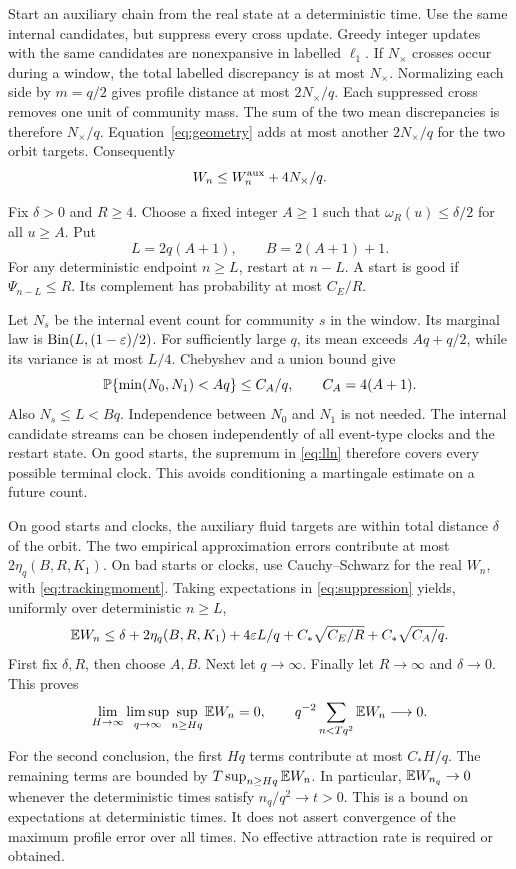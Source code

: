 Start an auxiliary chain from the real state at a deterministic time. Use the same internal candidates, but suppress every cross update. Greedy integer updates with the same candidates are nonexpansive in labelled $\ell_1$. If $N_\times$ crosses occur during a window, the total labelled discrepancy is at most $N_\times$. Normalizing each side by $m=q/2$ gives profile distance at most $2N_\times/q$. Each suppressed cross removes one unit of community mass. The sum of the two mean discrepancies is therefore $N_\times/q$. Equation~\eqref{eq:geometry} adds at most another $2N_\times/q$ for the two orbit targets. Consequently
\begin{equation}\label{eq:suppression}
 W_n\le W_n^{\rm aux}+4N_\times/q.
\end{equation}

Fix $\delta>0$ and $R\ge4$. Choose a fixed integer $A\ge1$ such that $\omega_R(u)\le\delta/2$ for all $u\ge A$. Put
\[
 L=2q(A+1),\qquad B=2(A+1)+1.
\]
For any deterministic endpoint $n\ge L$, restart at $n-L$. A start is good if $\Psi_{n-L}\le R$. Its complement has probability at most $C_E/R$.

Let $N_s$ be the internal event count for community $s$ in the window. Its marginal law is $\operatorname{Bin}(L,(1-\varepsilon)/2)$. For sufficiently large $q$, its mean exceeds $Aq+q/2$, while its variance is at most $L/4$. Chebyshev and a union bound give
\[
 \mathbb P\{\min(N_0,N_1)<Aq\}\le C_A/q,
 \qquad C_A=4(A+1).
\]
Also $N_s\le L<Bq$. Independence between $N_0$ and $N_1$ is not needed. The internal candidate streams can be chosen independently of all event-type clocks and the restart state. On good starts, the supremum in \eqref{eq:lln} therefore covers every possible terminal clock. This avoids conditioning a martingale estimate on a future count.

On good starts and clocks, the auxiliary fluid targets are within total distance $\delta$ of the orbit. The two empirical approximation errors contribute at most $2\eta_q(B,R,K_1)$. On bad starts or clocks, use Cauchy--Schwarz for the real $W_n$, with \eqref{eq:trackingmoment}. Taking expectations in \eqref{eq:suppression} yields, uniformly over deterministic $n\ge L$,
\begin{equation}\label{eq:restart}
 \mathbb E W_n\le\delta+2\eta_q(B,R,K_1)+4\varepsilon L/q
       +C_*\sqrt{C_E/R}+C_*\sqrt{C_A/q}.
\end{equation}
First fix $\delta,R$, then choose $A,B$. Next let $q\to\infty$. Finally let $R\to\infty$ and $\delta\to0$. This proves
\begin{equation}\label{eq:tracking}
 \lim_{H\to\infty}\limsup_{q\to\infty}
 \sup_{n\ge Hq}\mathbb E W_n=0,
 \qquad q^{-2}\sum_{n<Tq^2}\mathbb E W_n\longrightarrow0.
\end{equation}
For the second conclusion, the first $Hq$ terms contribute at most $C_*H/q$. The remaining terms are bounded by $T\sup_{n\ge Hq}\mathbb E W_n$. In particular, $\mathbb E W_{n_q}\to0$ whenever the deterministic times satisfy $n_q/q^2\to t>0$. This is a bound on expectations at deterministic times. It does not assert convergence of the maximum profile error over all times. No effective attraction rate is required or obtained.

